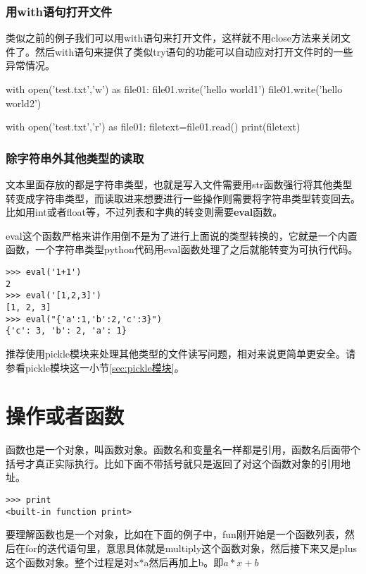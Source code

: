 \documentclass[12pt,oneside]{book}
\begin{document}
\begin{common-format}
\subsection{用with语句打开文件}
类似之前的例子我们可以用with语句来打开文件，这样就不用close方法来关闭文件了。然后with语句来提供了类似try语句的功能可以自动应对打开文件时的一些异常情况。

\begin{tcbpython}[]
with open('test.txt','w') as file01:
    file01.write('hello world1\n')
    file01.write('hello world2\n')

with open('test.txt','r') as file01:
    filetext=file01.read()
    print(filetext)
\end{tcbpython}



\subsection{除字符串外其他类型的读取}
文本里面存放的都是字符串类型，也就是写入文件需要用str函数强行将其他类型转变成字符串类型，而读取进来想要进行一些操作则需要将字符串类型转变回去。比如用int或者float等，不过列表和字典的转变则需要\textbf{eval}函数。

eval这个函数严格来讲作用倒不是为了进行上面说的类型转换的，它就是一个内置函数，一个字符串类型python代码用eval函数处理了之后就能转变为可执行代码。
\begin{Verbatim}
>>> eval('1+1')
2
>>> eval('[1,2,3]')
[1, 2, 3]
>>> eval("{'a':1,'b':2,'c':3}")
{'c': 3, 'b': 2, 'a': 1}
\end{Verbatim}

推荐使用pickle模块来处理其他类型的文件读写问题，相对来说更简单更安全。请参看pickle模块这一小节\ref{sec:pickle模块}。



\chapter{操作或者函数}
函数也是一个对象，叫函数对象。函数名和变量名一样都是引用，函数名后面带个括号才真正实际执行。比如下面不带括号就只是返回了对这个函数对象的引用地址。
\begin{Verbatim}
>>> print
<built-in function print>
\end{Verbatim}

要理解函数也是一个对象，比如在下面的例子中，fun刚开始是一个函数列表，然后在for的迭代语句里，意思具体就是multiply这个函数对象，然后接下来又是plus这个函数对象。整个过程是对x*a然后再加上b。即$ a*x +b $


\end{common-format}
\end{document}
